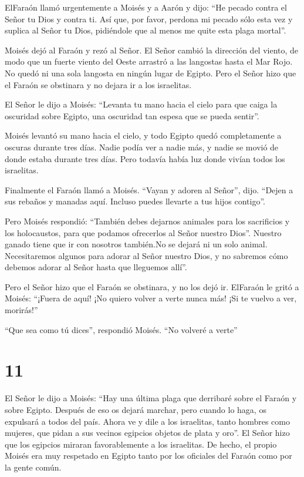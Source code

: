  ElFaraón llamó urgentemente a Moisés y a Aarón y dijo:
``He pecado contra el Señor tu Dios y contra ti.  Así que,
por favor, perdona mi pecado sólo esta vez y suplica al Señor tu Dios,
pidiéndole que al menos me quite esta plaga mortal''.

 Moisés dejó al Faraón y rezó al Señor.  El
Señor cambió la dirección del viento, de modo que un fuerte viento del
Oeste arrastró a las langostas hasta el Mar Rojo. No quedó ni una sola
langosta en ningún lugar de Egipto.  Pero el Señor hizo que
el Faraón se obstinara y no dejara ir a los israelitas.

 El Señor le dijo a Moisés: ``Levanta tu mano hacia el
cielo para que caiga la oscuridad sobre Egipto, una oscuridad tan espesa
que se pueda sentir''.

 Moisés levantó su mano hacia el cielo, y todo Egipto quedó
completamente a oscuras durante tres días.  Nadie podía ver
a nadie más, y nadie se movió de donde estaba durante tres días. Pero
todavía había luz donde vivían todos los israelitas.

 Finalmente el Faraón llamó a Moisés. ``Vayan y adoren al
Señor'', dijo. ``Dejen a sus rebaños y manadas aquí. Incluso puedes
llevarte a tus hijos contigo''.

 Pero Moisés respondió: ``También debes dejarnos animales
para los sacrificios y los holocaustos, para que podamos ofrecerlos al
Señor nuestro Dios''.  Nuestro ganado tiene que ir con
nosotros también.No se dejará ni un solo animal. Necesitaremos algunos
para adorar al Señor nuestro Dios, y no sabremos cómo debemos adorar al
Señor hasta que lleguemos allí''.

 Pero el Señor hizo que el Faraón se obstinara, y no los
dejó ir.  ElFaraón le gritó a Moisés: ``¡Fuera de aquí! ¡No
quiero volver a verte nunca más! ¡Si te vuelvo a ver, morirás!''

 ``Que sea como tú dices'', respondió Moisés. ``No volveré
a verte''

\hypertarget{section-10}{%
\section{11}\label{section-10}}

 El Señor le dijo a Moisés: ``Hay una última plaga que
derribaré sobre el Faraón y sobre Egipto. Después de eso os dejará
marchar, pero cuando lo haga, os expulsará a todos del país.
 Ahora ve y dile a los israelitas, tanto hombres como
mujeres, que pidan a sus vecinos egipcios objetos de plata y oro''.
 El Señor hizo que los egipcios miraran favorablemente a los
israelitas. De hecho, el propio Moisés era muy respetado en Egipto tanto
por los oficiales del Faraón como por la gente común.

